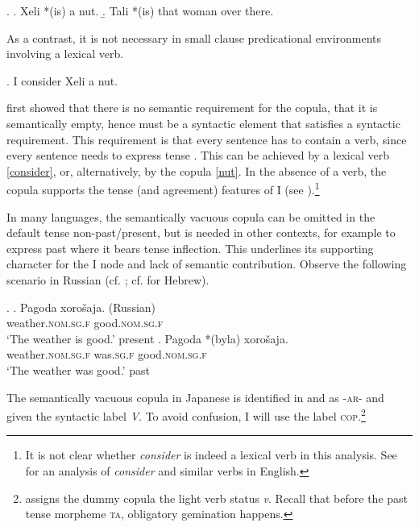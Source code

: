 \ex. \label{nut} \a. Xeli *(is) a nut.
\b. Tali *(is) that woman over there.

As a contrast, it is not necessary in small clause predicational environments involving a lexical verb.

\ex. I consider Xeli a nut. \label{consider} \null\hfill \citep[152]{rapoport:1987:copular}

\citet{rapoport:1987:copular} first showed that there is no semantic requirement for the copula, that it is semantically empty, hence must be a syntactic element that satisfies a syntactic requirement. This requirement is that every sentence has to contain a verb, since every sentence needs to express tense \citep[157]{rapoport:1987:copular}. This can be achieved by a lexical verb \ref{consider}, or, alternatively, by the copula \ref{nut}. In the absence of a verb, the copula supports the tense (and agreement) features of \textsc{I} (see \citealt[157]{rapoport:1987:copular}).\footnote{It is not clear whether \textit{consider} is indeed a lexical verb in this analysis. See \citet{bowers:1993:predication} for an analysis of \textit{consider} and similar verbs in English.}

In many languages, the semantically vacuous copula can be omitted in the default tense non-past/present, but is needed in other contexts, for example to express past where it bears tense inflection. This underlines its supporting character for the I node and lack of semantic contribution. Observe the following scenario in Russian (cf. \citealt{babby:2010:syntactic}; cf. \citealt{doron:1983:verbless, rapoport:1987:copular} for Hebrew).

\ex. \label{pagoda} \ag. Pagoda xorošaja. (Russian)\\
weather.\textsc{nom.sg.f} good.\textsc{nom.sg.f}\\
`The weather is good.' \null \hfill present
\bg. Pagoda *(byla) xorošaja.\\
weather.\textsc{nom.sg.f} was.\textsc{sg.f} good.\textsc{nom.sg.f}\\
`The weather was good.' \null \hfill past

The semantically vacuous copula in Japanese is identified in \citet{nishiyama:1999:adj} and \citet{urushibara:1993:syntactic} as -\textsc{ar}- and given the syntactic label \textit{V}. To avoid confusion, I will use the label \textsc{cop}.\footnote{\citet{watanabe:2013:non} assigns the dummy copula the light verb status \textit{v}. Recall that before the past tense morpheme \textsc{ta}, obligatory gemination happens.}

